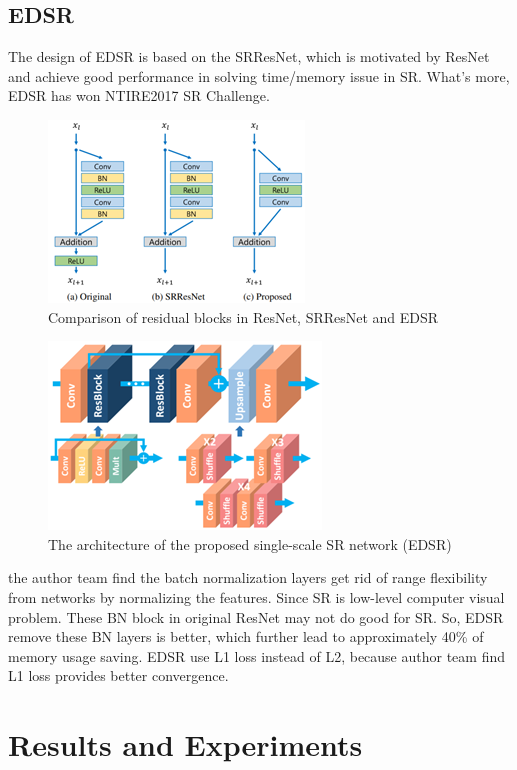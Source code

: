 \documentclass[10pt,twocolumn,letterpaper]{article}
\begin{document}
\subsection{EDSR}
The design of EDSR is based on the SRResNet\cite{8}, which is motivated by ResNet\cite{7} and achieve good performance in solving time/memory issue in SR. 
What's more, EDSR has won NTIRE2017 SR Challenge.
\begin{figure}[H]
    \centering
    \includegraphics[scale = 0.6]{images/EDSR1.png}
    \caption{Comparison of residual blocks in ResNet, SRResNet and EDSR}
\end{figure} 
\begin{figure}[H]
    \centering
    \includegraphics[scale = 0.6]{images/EDSR2.png}
    \caption{The architecture of the proposed single-scale SR network (EDSR)}
\end{figure} 
the author team find the batch normalization layers get rid of range flexibility from networks by normalizing the features. 
Since SR is low-level computer visual problem. These BN block in original ResNet may not do good for SR. 
So, EDSR remove these BN layers is better, which further lead to approximately 40\% of memory usage saving.\cite{4}
EDSR use L1 loss instead of L2, because author team find L1 loss provides better convergence.



\section{Results and Experiments}
\end{document}
